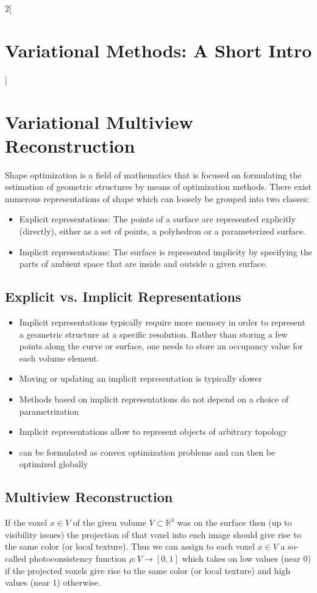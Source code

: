 \documentclass[oneside,fontsize=11pt,paper=a4]{scrartcl}
\begin{document}
\begin{multicols}{2}[\section{Variational Methods: A Short Intro}]
\section{Variational Multiview Reconstruction }
Shape optimization is a field of mathematics that is focused on formulating the estimation of geometric structures by means of optimization methods.
There exist numerous representations of shape which can loosely be grouped into two classes:
\begin{itemize}
    \item Explicit representations: The points of a surface are represented explicitly (directly), either as a set of points, a polyhedron or a parameterized surface.
    \item Implicit representations: The surface is represented implicity by specifying the parts of ambient space that are inside and outside a given surface.
\end{itemize}
\subsection{Explicit vs. Implicit Representations}
\begin{itemize}
    \item Implicit representations typically require more memory in order to represent a geometric structure at a specific resolution. Rather than storing a few points along the curve or surface, one needs to store an occupancy value for each volume element.
    \item Moving or updating an implicit representation is typically slower
    \item Methods based on implicit representations do not depend on a choice of parametrization
    \item Implicit representations allow to represent objects of arbitrary topology
    \item can be formulated as convex optimization problems and can then be optimized globally
\end{itemize}

\subsection{Multiview Reconstruction}
If the voxel $x \in V$ of the given volume $V \subset \mathbb{R}^3$ was on the surface then (up to visibility issues) the projection of that voxel into each image should give rise to the same color (or local texture). Thus we can assign to each voxel $x \in V$ a so-called photoconsistency function $\rho : V \rightarrow [0,1] $ which takes on low values (near 0) if the projected voxels give rise to the same color (or local texture) and high values (near
1) otherwise.


\end{multicols}
\end{document}
